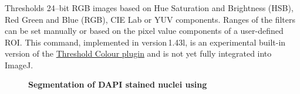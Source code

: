 \subsubsection{\protect{}\label{sub:Color-Threshold...}}

Thresholds 24--bit
RGB images based on Hue Saturation and Brightness
(HSB), Red Green and Blue (RGB), CIE Lab or YUV
components. Ranges of the filters can be set manually or based on
the pixel value components of a user-defined ROI. This command, implemented
in version\,1.43l, is an experimental built-in version of the \href{http://www.dentistry.bham.ac.uk/landinig/software/software.html}{Threshold Colour plugin}
\cite{C-ColorThres} and is not yet fully integrated into ImageJ.

\begin{figure}[H]
\caption{\textbf{Segmentation of DAPI stained nuclei using \protect{}}}
\end{figure}

